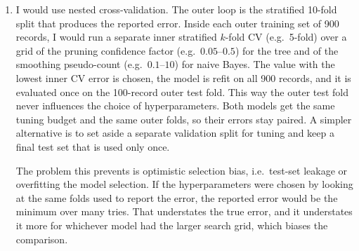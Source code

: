 \documentclass[12pt,letterpaper, onecolumn]{exam}
\begin{document}
\begin{questions}
\begin{solution}
\begin{enumerate}[1.]
            The paired t-test works on the differences $d_i = \text{err}_{NB,i}-\text{err}_{DT,i}$, which only mean something if both errors in a pair come from the same training and test records. Some folds are simply harder than others (fold 7 is the worst fold for both models), so the two error series move together. From Table 1, the sample variances are $s^2_{DT} = 2.4$ and $s^2_{NB}\approx 3.16$, and the sample covariance is $\widehat{\operatorname{Cov}}\approx 1.98$, a correlation of $r\approx 0.72$. Pairing cancels this shared fold difficulty, since
            \begin{align*}
                \operatorname{Var}(d_i) &= \operatorname{Var}(\text{err}_{NB})+\operatorname{Var}(\text{err}_{DT})-2\operatorname{Cov}(\text{err}_{NB},\text{err}_{DT})\\
                &= 2.4+3.16-2(1.98) = 1.6
            \end{align*}
            which is much smaller than either variance on its own. If we ignored the pairing and ran an unpaired two-sample test on the same numbers, we would get
            \begin{equation*}
                t = \frac{14.6-13.2}{\sqrt{2.4/10+3.16/10}}\approx 1.88 < t_{0.025,\,18} = 2.101,
            \end{equation*}
            and we would fail to reject. The pairing is what makes the difference detectable. With different folds there is no natural pairing, the covariance term is lost, and the paired test is invalid.

            \item I would use nested cross-validation. The outer loop is the stratified 10-fold split that produces the reported error. Inside each outer training set of 900 records, I would run a separate inner stratified $k$-fold CV (e.g.\ 5-fold) over a grid of the pruning confidence factor (e.g.\ $0.05$--$0.5$) for the tree and of the smoothing pseudo-count (e.g.\ $0.1$--$10$) for naive Bayes. The value with the lowest inner CV error is chosen, the model is refit on all 900 records, and it is evaluated once on the 100-record outer test fold. This way the outer test fold never influences the choice of hyperparameters. Both models get the same tuning budget and the same outer folds, so their errors stay paired. A simpler alternative is to set aside a separate validation split for tuning and keep a final test set that is used only once.

            The problem this prevents is optimistic selection bias, i.e.\ test-set leakage or overfitting the model selection. If the hyperparameters were chosen by looking at the same folds used to report the error, the reported error would be the minimum over many tries. That understates the true error, and it understates it more for whichever model had the larger search grid, which biases the comparison.


\end{enumerate}
\end{solution}
\end{questions}
\end{document}
